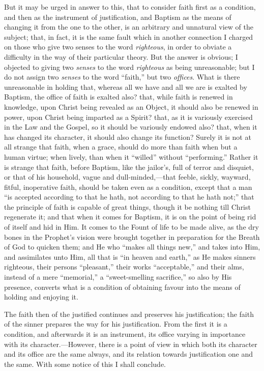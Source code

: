But it may be urged in answer to this, that to consider faith first
as a condition, and then as the instrument of justification, and
Baptism as the means of changing it from the one to the other, is an
arbitrary and unnatural view of the subject; that, in fact, it is the
same fault which in another connection I charged on those who give two
senses to the word \emph{righteous}, in order to obviate a difficulty
in the way of their particular theory. But the answer is obvious; I
objected to giving two \emph{senses} to the word \emph{righteous} as
being unreasonable; but I do not assign two \emph{senses} to the word
``faith,'' but two \emph{offices}. What is there unreasonable
in holding that, whereas all we have and all we are is exalted by
Baptism, the office of faith is exalted also? that, while faith is
renewed in knowledge, upon Christ being revealed as an Object, it
should also be renewed in power, upon Christ being imparted as a
Spirit? that, as it is variously exercised in the Law and the Gospel,
so it should be variously endowed also? that, when it has changed its
character, it should also change its function? Surely it is not at all
strange that faith, when a grace, should do more than faith when but a
human virtue; when lively, than when it ``willed'' without
``performing.'' Rather it is strange that faith, before
Baptism, like the jailor's, full of terror and disquiet, or that of
his household, vague and dull-minded,—that feeble, sickly, wayward,
fitful, inoperative faith, should be taken even as a condition, except
that a man ``is accepted according to that he hath, not according
to that he hath not;'' that the principle of faith is
capable of great things, though it be nothing till Christ regenerate
it; and that when it comes for Baptism, it is on the point of being
rid of itself and hid in Him. It comes to the Fount of life to be made
alive, as the dry bones in the Prophet's vision were brought together
in preparation for the Breath of God to quicken them; and He who
``makes all things new,'' and takes into Him, and assimilates
unto Him, all that is ``in heaven and earth,'' as He makes
sinners righteous, their persons ``pleasant,'' their works
``acceptable,'' and their alms, instead of a mere
``memorial,'' a ``sweet-smelling sacrifice,'' so also
by His presence, converts what is a condition of obtaining favour into
the means of holding and enjoying it.

The faith then of the justified continues and preserves his
justification; the faith of the sinner prepares the way for his
justification. From the first it is a condition, and afterwards it is
an instrument, its office varying in importance with its character.—However,
there is a point of view in which both its character and its office
are the same always, and its relation towards justification one and
the same. With some notice of this I shall conclude.

